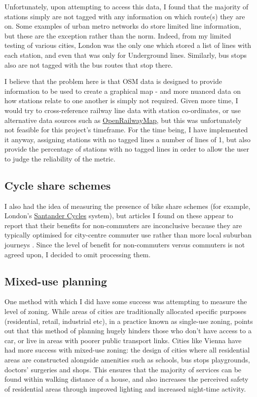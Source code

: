 \documentclass[11pt]{article} %
\begin{document}
Unfortunately, upon attempting to access this data, I found that the majority of stations simply are not tagged with any information on which route(s) they are on. Some examples of urban metro networks do store limited line information, but these are the exception rather than the norm. Indeed, from my limited testing of various cities, London was the only one which stored a list of lines with each station, and even that was only for Underground lines. Similarly, bus stops also are not tagged with the bus routes that stop there.

I believe that the problem here is that OSM data is designed to provide information to be used to create a graphical map - and more nuanced data on how stations relate to one another is simply not required. Given more time, I would try to cross-reference railway line data with station co-ordinates, or use alternative data sources such as \href{https://www.openrailwaymap.org/}{OpenRailwayMap}, but this was unfortunately not feasible for this project's timeframe. For the time being, I have implemented it anyway, assigning stations with no tagged lines a number of lines of 1, but also provide the percentage of stations with no tagged lines in order to allow the user to judge the reliability of the metric.

\subsection{Cycle share schemes}
I also had the idea of measuring the presence of bike share schemes (for example, London's \href{https://tfl.gov.uk/modes/cycling/santander-cycles}{Santander Cycles} system), but articles I found on these appear to report that their benefits for non-commuters are inconclusive because they are typically optimised for city-centre commuter use rather than more local suburban journeys \parencite{Beecham2014}. Since the level of benefit for non-commuters versus commuters is not agreed upon, I decided to omit processing them.

\subsection{Mixed-use planning}
One method with which I did have some success was attempting to measure the level of zoning. While areas of cities are traditionally allocated specific purposes (residential, retail, industrial etc), in a practice known as single-use zoning, \cite{Perez2019} points out that this method of planning hugely hinders those who don't have access to a car, or live in areas with poorer public transport links. Cities like Vienna have had more success with mixed-use zoning: the design of cities where all residential areas are constructed alongside amenities such as schools, bus stops playgrounds, doctors' surgeries and shops. This ensures that the majority of services can be found within walking distance of a house, and also increases the perceived safety of residential areas through improved lighting and increased night-time activity.
\end{document}
